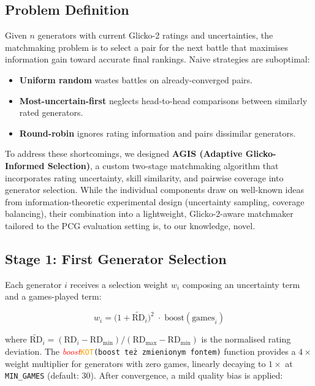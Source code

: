 \documentclass[shortabstract, mgr, english]{iithesis}
\newcommand{\DEBUG}[1]{{#1}} %
\newcommand{\KOT}[1]{\DEBUG{\tt{\textcolor{orange}{KOT}(}{#1}{)}}}
\newcommand{\changed}[1]{\textcolor{red}{#1}}
\begin{document}
\subsection{Problem Definition}
\label{subsec:sd-matchmaking-problem}

Given $n$ generators with current Glicko-2 ratings and uncertainties, the matchmaking
problem is to select a pair for the next battle that maximises information gain toward
accurate final rankings. Naive strategies are suboptimal:

\begin{itemize}
    \item \textbf{Uniform random} wastes battles on already-converged pairs.
    \item \textbf{Most-uncertain-first} neglects head-to-head comparisons between
          similarly rated generators.
    \item \textbf{Round-robin} ignores rating information and pairs dissimilar generators.
\end{itemize}

To address these shortcomings, we designed \textbf{AGIS (Adaptive Glicko-Informed
Selection)}, a custom two-stage matchmaking algorithm that incorporates rating
uncertainty, skill similarity, and pairwise coverage into generator selection.
While the individual components draw on well-known ideas from information-theoretic
experimental design (uncertainty sampling, coverage balancing), their combination
into a lightweight, Glicko-2-aware matchmaker tailored to the PCG evaluation setting
is, to our knowledge, novel.

\subsection{Stage 1: First Generator Selection}
\label{subsec:sd-agis-stage1}

Each generator $i$ receives a selection weight $w_i$ composing an uncertainty term and
a games-played term:

\begin{equation}
\label{eq:agis-w1}
w_i = \bigl(1 + \widetilde{\text{RD}}_i\bigr)^2 \;\cdot\; \text{boost}(\text{games}_i)
\end{equation}

where $\widetilde{\text{RD}}_i = (\text{RD}_i - \text{RD}_{\min}) / (\text{RD}_{\max} -
\text{RD}_{\min})$ is the normalised rating deviation. The \changed{\emph{boost}}\KOT{boost też zmienionym fontem} function provides a $4\times$
weight multiplier for generators with zero games, linearly decaying to $1\times$ at
\texttt{MIN\_GAMES} (default: 30). After convergence, a mild quality bias is applied:
\end{document}
